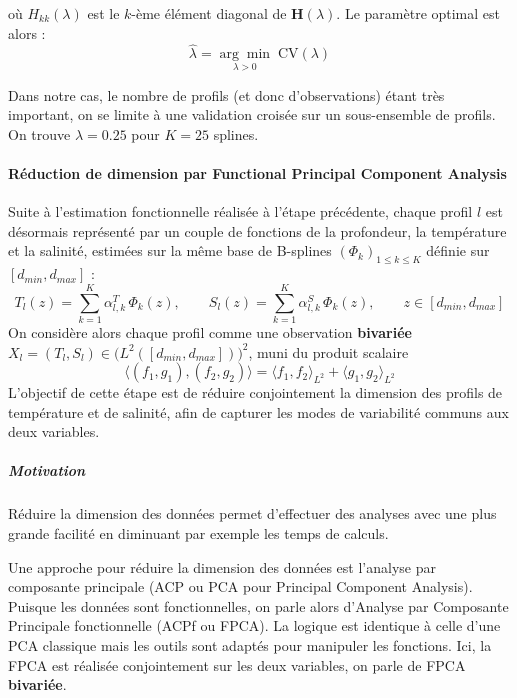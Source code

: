 \documentclass{article}
\begin{document}
	où $H_{kk}(\lambda)$ est le $k$-ème élément diagonal de $\mathbf{H}(\lambda)$. 
	Le paramètre optimal est alors :
	\begin{equation}
		\hat{\lambda} = \underset{\lambda > 0}{\arg\min}\; \text{CV}(\lambda)
	\end{equation}
	
	Dans notre cas, le nombre de profils (et donc d'observations) étant très important, on se limite à une validation croisée sur un sous-ensemble de profils. On trouve $\lambda = 0.25$ pour $K = 25$ splines. 
	
	\paragraph{Réduction de dimension par Functional Principal Component Analysis}
	
	Suite à l'estimation fonctionnelle réalisée à l'étape précédente, chaque profil $l$ est désormais représenté par un couple de fonctions de la profondeur, la température et la salinité, estimées sur la même base de B-splines $(\Phi_k)_{1\leq k \leq K}$ définie sur $[d_{min}, d_{max}]$ :
	\[
	T_l(z) = \sum_{k=1}^{K} \alpha_{l,k}^{T}\, \Phi_k(z), 
	\qquad
	S_l(z) = \sum_{k=1}^{K} \alpha_{l,k}^{S}\, \Phi_k(z),
	\qquad z \in [d_{min}, d_{max}]
	\]
	On considère alors chaque profil comme une observation \textbf{bivariée} $X_l = (T_l, S_l) \in \big(L^2([d_{min}, d_{max}])\big)^2$, muni du produit scalaire
	\[
	\langle (f_1, g_1), (f_2, g_2) \rangle = \langle f_1, f_2 \rangle_{L^2} + \langle g_1, g_2 \rangle_{L^2}
	\]
	L'objectif de cette étape est de réduire conjointement la dimension des profils de température et de salinité, afin de capturer les modes de variabilité communs aux deux variables.
	
	\subparagraph{Motivation}
	Réduire la dimension des données permet d'effectuer des analyses avec une plus grande facilité en diminuant par exemple les temps de calculs.
	
	
	\vspace{2 em}
	
	Une approche pour réduire la dimension des données est l'analyse par composante principale (ACP ou PCA pour Principal Component Analysis). Puisque les données sont fonctionnelles, on parle alors d'Analyse par Composante Principale fonctionnelle (ACPf ou FPCA). La logique est identique à celle d'une PCA classique mais les outils sont adaptés pour manipuler les fonctions. Ici, la FPCA est réalisée conjointement sur les deux variables, on parle de FPCA \textbf{bivariée}.
	
\end{document}

